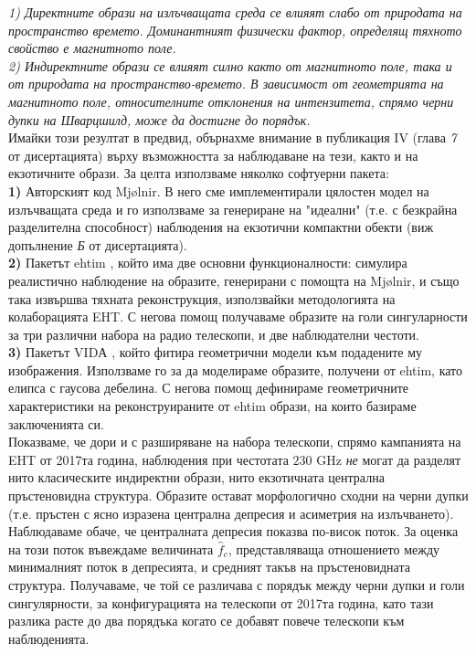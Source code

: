 \emph{1) Директните образи на излъчващата среда се влияят слабо от природата на пространство времето. Доминантният физически фактор, определящ тяхното свойство е магнитното поле.}\\

\emph{2) Индиректните образи се влияят силно както от магнитното поле, така и от природата на пространство-времето. В зависимост от геометрията на магнитното поле, относителните отклонения на интензитета, спрямо черни дупки на Шварцшилд, може да достигне до порядък.}\\

Имайки този резултат в предвид, обърнахме внимание в публикация IV (глава \emph{7} от дисертацията) върху възможността за наблюдаване на тези, както и на екзотичните образи. За целта използваме няколко софтуерни пакета:\\

\textbf{1)} Авторският код Mjølnir. В него сме имплементирали цялостен модел на излъчващата среда и го използваме за генериране на "идеални" (т.е. с безкрайна разделителна способност) наблюдения на екзотични компактни обекти (виж допълнение \emph{Б} от дисертацията).\\

\textbf{2)} Пакетът ehtim \cite{EHTIM}, който има две основни функционалности: симулира реалистично наблюдение на образите, генерирани с помощта на Mjølnir, и също така извършва тяхната реконструкция, използвайки методологията на колаборацията EHT. С негова помощ получаваме образите на голи сингуларности за три различни набора на радио телескопи, и две наблюдателни честоти.\\

\textbf{3)} Пакетът VIDА \cite{VIDA}, който фитира геометрични модели към подадените му изображения. Използваме го за да моделираме образите, получени от ehtim, като елипса с гаусова дебелина. С негова помощ дефинираме геометричните характеристики на реконструираните от ehtim образи, на които базираме заключенията си.\\

Показваме, че дори и с разширяване на набора телескопи, спрямо кампанията на EHT от 2017та година, наблюдения при честотата $230$ GHz \emph{не} могат да разделят нито класическите индиректни образи, нито екзотичната централна пръстеновидна структура. Образите остават морфологично сходни на черни дупки (т.е. пръстен с ясно изразена централна депресия и асиметрия на излъчването). Наблюдаваме обаче, че централната депресия показва по-висок поток. За оценка на този поток въвеждаме величината $\hat{f}_c$, представляваща отношението между минималният поток в депресията, и средният такъв на пръстеновидната структура. Получаваме, че той се различава с порядък между черни дупки и голи сингулярности, за конфигурацията на телескопи от 2017та година, като тази разлика расте до два порядъка когато се добавят повече телескопи към наблюденията.\\

